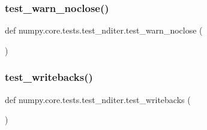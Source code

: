 \subsubsection{\texorpdfstring{test\+\_\+warn\+\_\+noclose()}{test\_warn\_noclose()}}
{\footnotesize\ttfamily def numpy.\+core.\+tests.\+test\+\_\+nditer.\+test\+\_\+warn\+\_\+noclose (\begin{DoxyParamCaption}{ }\end{DoxyParamCaption})}

\mbox{\label{namespacenumpy_1_1core_1_1tests_1_1test__nditer_a3acc7a08e9a4dd9f20d3f32f134bc598}} 
\subsubsection{\texorpdfstring{test\+\_\+writebacks()}{test\_writebacks()}}
{\footnotesize\ttfamily def numpy.\+core.\+tests.\+test\+\_\+nditer.\+test\+\_\+writebacks (\begin{DoxyParamCaption}{ }\end{DoxyParamCaption})}


